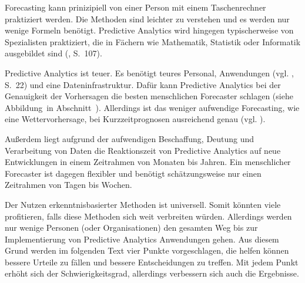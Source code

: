 Forecasting kann prinizipiell von einer Person mit einem Taschenrechner praktiziert
werden. Die Methoden sind leichter zu verstehen und es werden nur wenige Formeln benötigt.
Predictive Analytics wird hingegen typischerweise von Spezialisten praktiziert, 
die in Fächern wie Mathematik, Statistik oder Informatik ausgebildet sind (\cite{Gluchowski}, S.~107).

Predictive Analytics ist teuer. Es benötigt teures Personal, Anwendungen (vgl. \cite{Iffert}, S.~22) und eine
Dateninfrastruktur. Dafür kann Predictive Analytics bei der
Genauigkeit der Vorhersagen die besten menschlichen Forecaster schlagen (siehe Abbildung~\xcom in Abschnitt~\xcom).
Allerdings ist das weniger aufwendige Forecasting, wie eine Wettervorhersage, bei Kurzzeitprognosen ausreichend genau
(vgl. \cite{Economist}).

Außerdem liegt aufgrund der aufwendigen Beschaffung, Deutung und Verarbeitung von Daten die Reaktionszeit von
Predictive Analytics auf neue Entwicklungen in einem Zeitrahmen von Monaten bis Jahren. Ein menschlicher Forecaster
ist dagegen flexibler und benötigt schätzungsweise nur einen Zeitrahmen von Tagen bis Wochen.

Der Nutzen erkenntnisbasierter Methoden ist universell. Somit könnten viele profitieren,
falls diese Methoden sich weit verbreiten würden. Allerdings werden nur wenige Personen
(oder Organisationen) den gesamten Weg bis zur Implementierung von Predictive Analytics
Anwendungen gehen. Aus diesem Grund werden im folgenden Text vier Punkte vorgeschlagen,
die helfen können bessere Urteile zu fällen und bessere Entscheidungen zu treffen. Mit jedem
Punkt erhöht sich der Schwierigkeitsgrad, allerdings verbessern sich auch die Ergebnisse.

